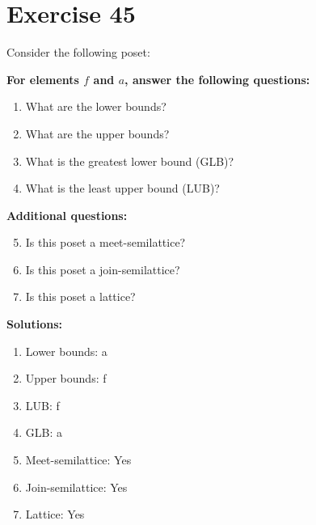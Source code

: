 \documentclass{article}
\begin{document}
\section*{Exercise 45}
Consider the following poset:
\begin{center}
\end{center}

    \textbf{For elements $f$ and $a$, answer the following questions:}
\begin{enumerate}
    \item What are the lower bounds?
    \item What are the upper bounds?
    \item What is the greatest lower bound (GLB)?
    \item What is the least upper bound (LUB)?
\end{enumerate}
    \hspace*{3ex} \textbf{Additional questions:}
\begin{enumerate}
    \setcounter{enumi}{4}
    \item Is this poset a meet-semilattice?
    \item Is this poset a join-semilattice?
    \item Is this poset a lattice?
\end{enumerate}

\textbf{Solutions:}
\begin{enumerate}
    \item Lower bounds: {a}
    \item Upper bounds: {f}
    \item LUB: f
    \item GLB: a
    \item Meet-semilattice: Yes
    \item Join-semilattice: Yes
    \item Lattice: Yes
\end{enumerate}
\newpage
\end{document}
